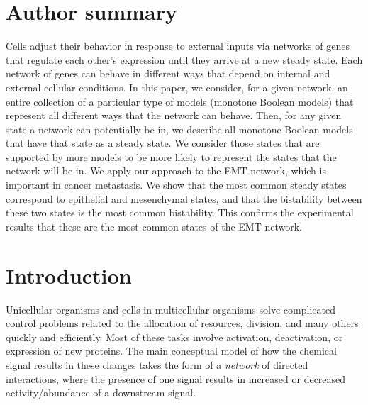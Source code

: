\documentclass[10pt,letterpaper]{article}
\begin{document}

%
\section*{Author summary}
Cells adjust their behavior in response to external inputs via networks of genes that regulate each other's expression until they arrive at a new steady state. Each network of genes can behave in different ways that depend on internal and external cellular conditions. In this paper, we consider, for a given network, an entire collection of a particular type of models (monotone Boolean models) that represent all different ways that the network can behave. Then, for any given state a network can potentially be in, we describe all monotone Boolean models that have that state as a steady state. We consider those states that are supported by more models to be more likely to represent the states that the network will be in. 
We apply our approach to the EMT network, which is important in cancer metastasis. We show that the most common steady states correspond to epithelial and mesenchymal states, and that the bistability between these two states is the most common bistability. This confirms the experimental results that these are the most common states of the EMT network.


\linenumbers

\section{Introduction}
Unicellular organisms and cells in multicellular organisms solve complicated control problems related to the allocation of resources, division, and many others quickly and efficiently. Most of these tasks involve activation, deactivation, or expression of new proteins. The main conceptual model of how the chemical signal results in these changes takes the form of a \textit{network} of directed interactions, where the presence of one signal results in increased or decreased activity/abundance of a downstream signal. 
\end{document}
